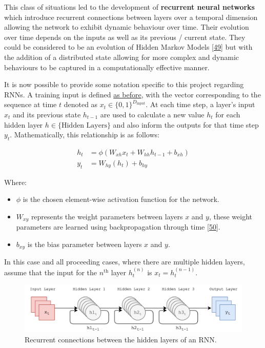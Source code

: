 \documentclass[12pt,]{article}
\providecommand{\tightlist}{%
  \setlength{\itemsep}{0pt}\setlength{\parskip}{0pt}}
\begin{document}
This class of situations led to the development of \textbf{recurrent
neural networks} which introduce recurrent connections between layers
over a temporal dimension allowing the network to exhibit dynamic
behaviour over time. Their evolution over time depends on the inputs as
well as its previous / current state. They could be considered to be an
evolution of Hidden Markov Models
{[}\protect\hyperlink{ref-baum1966}{49}{]} but with the addition of a
distributed state allowing for more complex and dynamic behaviours to be
captured in a computationally effective manner.

It is now possible to provide some notation specific to this project
regarding RNNs. A training input is defined
\protect\hyperlink{buildinganeffectiverepresentation}{as before}, with
the vector corresponding to the sequence at time \(t\) denoted as
\(x_t\in \{0,1\}^{D_{\text{input}}}\). At each time step, a layer's
input \(x_t\) and its previous state \(h_{t-1}\) are used to calculate a
new value \(h_t\) for each hidden layer \(h\in\{\text{Hidden Layers}\}\)
and also inform the outputs for that time step \(y_t\). Mathematically,
this relationship is as follows:

\[\begin{aligned}
h_t &= \phi(W_{xh} x_t + W_{hh} h_{t-1} + b_{xh}) \\
y_t &= W_{hy}(h_t) + b_{hy}
\end{aligned}\]

Where:

\begin{itemize}
\tightlist
\item
  \(\phi\) is the chosen element-wise activation function for the
  network.
\item
  \(W_{xy}\) represents the weight parameters between layers \(x\) and
  \(y\), these weight parameters are learned using backpropagation
  through time
  {[}\protect\hyperlink{ref-werbos1990backpropagation}{50}{]}.
\item
  \(b_{xy}\) is the bias parameter between layers \(x\) and \(y\).
\end{itemize}

In this case and all proceeding cases, where there are multiple hidden
layers, assume that the input for the \(n^{\text{th}}\) layer
\(h^{(n)}_t\) is \(x_t = h^{(n-1)}_t\).

\begin{figure}
\centering
\includegraphics{Images/rnn.png}
\caption{Recurrent connections between the hidden layers of an RNN.}
\end{figure}
\end{document}
